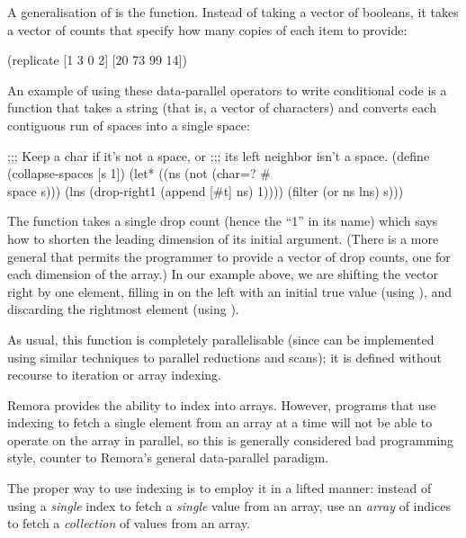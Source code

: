 A generalisation of  is the  function.
Instead of taking a vector of booleans, it takes a vector of
counts that specify how many copies of each item to provide:
\begin{code}
    (replicate [1    3   0   2]
               [20  73  99  14])
\result{[20 73 73 73 14 14]}\end{code}

An example of using these data-parallel operators to write conditional
code is a function that takes a string (that is, a vector of characters)
and converts each contiguous run of spaces into a single space:
\begin{code}
;;; Keep a char if it's not a space, or
;;; its left neighbor isn't a space.
(define (collapse-spaces [s 1])
  (let* ((ns  (not (char=? #\\space s)))
         (lns (drop-right1 (append [#t] ns) 1))))
    (filter (or ns lns) s)))\end{code}
%
The  function takes a single drop count
(hence the ``1'' in its name) which says how to shorten
the leading dimension of its initial argument.
(There is a more general  that permits the programmer
to provide a vector of drop counts, one for each dimension of the array.)
In our example above, we are shifting the  vector right by one element, 
filling in on the left with an initial true value (using ),
and discarding the rightmost element (using ).

As usual, this function is completely parallelisable
(since  can be implemented using similar techniques to
parallel reductions and scans);
it is defined without recourse to iteration or array indexing.

\label{sec:indexing}

Remora provides the ability to index into arrays.
However, programs that use indexing to fetch a single element from an array
at a time will not be able to operate on the array in parallel,
so this is generally considered bad programming style,
counter to Remora's general data-parallel paradigm.

The proper way to use indexing is to employ it in a lifted manner:
instead of using a \emph{single} index to fetch a \emph{single} value
from an array, use an \emph{array} of indices to fetch a
\emph{collection} of values from an array.

